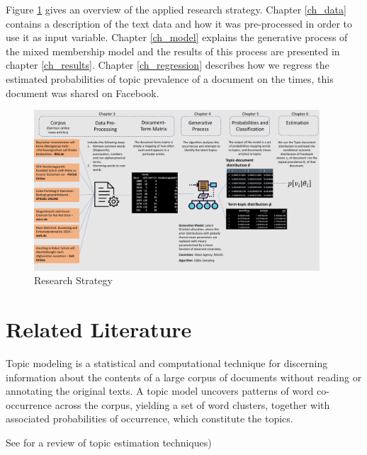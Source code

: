 \documentclass[12pt,a4paper,notitlepage]{article}
\begin{document}
Figure \ref{fig_research_strat} gives an overview of the applied research strategy. Chapter \ref{ch_data} contains a description of the text data and how it was pre-processed in order to use it as input variable. Chapter \ref{ch_model} explains the generative process of the mixed membership model and the results of this process are presented in chapter \ref{ch_results}. Chapter \ref{ch_regression} describes how we regress the estimated probabilities of topic prevalence of a document on the times, this document was shared on Facebook.

\begin{figure}[ht]
	\centering
	\includegraphics[width=0.95\textwidth]{../figs/research_strategy.pdf} 
	\caption{Research Strategy}
	\label{fig_research_strat}
\end{figure}


\section{Related Literature}




Topic modeling is a statistical and computational technique for discerning information about the contents of a large corpus of documents without reading or annotating the original texts. A topic model uncovers patterns of word co-occurrence across the corpus, yielding a set of word clusters, together with associated probabilities of occurrence, which constitute the topics.

See \citep{taddy_estimation_2012} for a review of topic estimation techniques)
\end{document}

